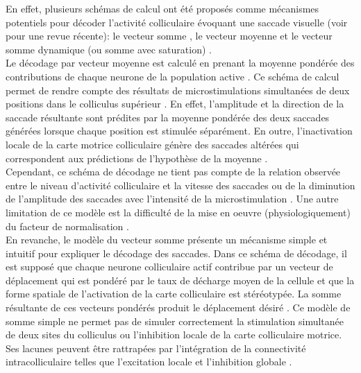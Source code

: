 En effet, plusieurs schémas de calcul ont été proposés comme mécanismes potentiels pour décoder l'activité colliculaire évoquant une saccade visuelle (voir \cite{Gandhi:2011} pour une revue récente): le vecteur somme \cite{Badler:2002, VanGisbergen:1987}, le vecteur moyenne \cite{Lee:1988, Walton:2005} et le vecteur somme dynamique (ou somme avec saturation) \cite{Goossens:2006,Groh:2001}.\\

Le décodage par vecteur moyenne est calculé en prenant la moyenne pondérée des contributions de chaque neurone de la population active \cite{Lee:1988, Walton:2005}. Ce schéma de calcul permet de rendre compte des résultats de microstimulations simultanées de deux positions dans le colliculus supérieur \cite{Katnani:2010, Robinson:1972}. En effet, l'amplitude et la direction de la saccade résultante sont prédites par la moyenne pondérée des deux saccades générées lorsque chaque position est stimulée séparément. En outre, l'inactivation locale de la carte motrice colliculaire génère des saccades altérées qui correspondent aux prédictions de l'hypothèse de la moyenne \cite{Lee:1988}.\\

Cependant, ce schéma de décodage ne tient pas compte de la relation observée entre le niveau d'activité colliculaire et la vitesse des saccades \cite{Goossens:2000} ou de la diminution de l'amplitude des saccades avec l'intensité de la microstimulation \cite{Groh:2011,Katnani:2010}. Une autre limitation de ce modèle est la difficulté de la mise en oeuvre (physiologiquement) du facteur de normalisation \cite{Groh:2001}.\\

En revanche, le modèle du vecteur somme présente un mécanisme simple et intuitif pour expliquer le décodage des saccades. Dans ce schéma de décodage, il est supposé que chaque neurone colliculaire actif contribue par un vecteur de déplacement qui est pondéré par le taux de décharge moyen de la cellule et que la forme spatiale de l'activation de la carte colliculaire est stéréotypée. La somme résultante de ces vecteurs pondérés produit le déplacement désiré \cite{VanGisbergen:1987}. Ce modèle de somme simple ne permet pas de simuler correctement la stimulation simultanée de deux sites du colliculus ou l'inhibition locale de la carte colliculaire motrice. Ses lacunes peuvent être rattrapées par l'intégration de la connectivité intracolliculaire telles que l'excitation locale et l'inhibition globale \cite{VanOpstal:1989}.\\ 

